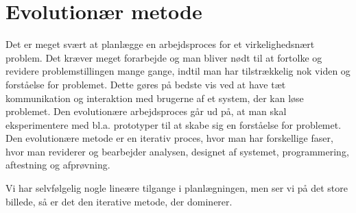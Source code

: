 \section{Evolutionær metode}
\label{sec:evolution}

Det er meget svært at planlægge en arbejdsproces for et virkelighedsnært problem. Det kræver meget forarbejde og man bliver nødt til at fortolke og revidere problemstillingen mange gange, indtil man har tilstrækkelig nok viden og forståelse for problemet. Dette gøres på bedste vis ved at have tæt kommunikation og interaktion med brugerne af et system, der kan løse problemet. Den evolutionære arbejdsproces går ud på, at man skal eksperimentere med bl.a. prototyper til at skabe sig en forståelse for problemet. Den evolutionære metode er en iterativ proces, hvor man har forskellige faser, hvor man reviderer og bearbejder analysen, designet af systemet, programmering, aftestning og afprøvning.

Vi har selvfølgelig nogle lineære tilgange i planlægningen, men ser vi på det store billede, så er det den iterative metode, der dominerer.





